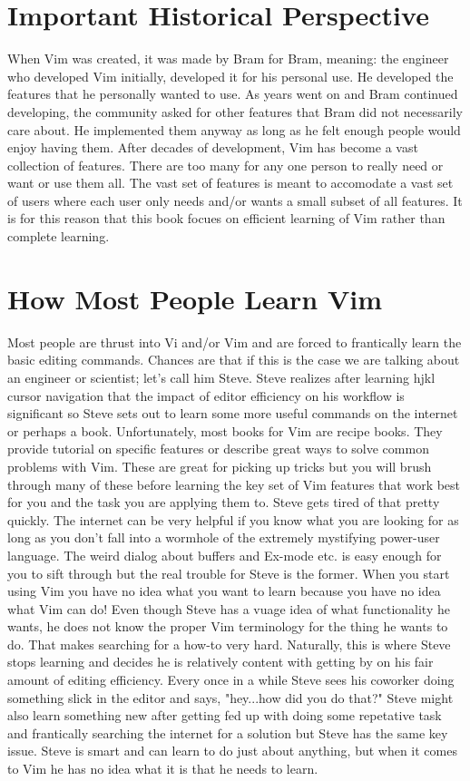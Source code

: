 \documentclass[12pt]{book}
\begin{document}
\section{Important Historical Perspective}
When Vim was created, it was made by Bram for Bram, meaning: the engineer who developed Vim initially, developed it for his personal use.
He developed the features that he personally wanted to use.  
As years went on and Bram continued developing, the community asked for other features that Bram did not necessarily care about.
He implemented them anyway as long as he felt enough people would enjoy having them. 
After decades of development, Vim has become a vast collection of features.
There are too many for any one person to really need or want or use them all.  
The vast set of features is meant to accomodate a vast set of users where each user only needs and/or wants a small subset of all features.
It is for this reason that this book focues on efficient learning of Vim rather than complete learning.  

\section{How Most People Learn Vim}
Most people are thrust into Vi and/or Vim and are forced to frantically learn the basic editing commands.  
Chances are that if this is the case we are talking about an engineer or scientist; let's call him Steve.  
Steve realizes after learning hjkl cursor navigation that the impact of editor efficiency on his workflow is significant so Steve sets out to learn some more useful commands on the internet 
or perhaps a book.  
Unfortunately, most books for Vim are recipe books.  
They provide tutorial on specific features or describe great ways to solve common problems with Vim.  
These are great for picking up tricks but you will brush through many of these before learning the key set of Vim features that work best for you and the task you are applying them to.  
Steve gets tired of that pretty quickly.  
The internet can be very helpful if you know what you are looking for as long as you don't fall into a wormhole of the extremely mystifying power-user language.  
The weird dialog about buffers and Ex-mode etc. is easy enough for you to sift through but the real trouble for Steve is the former.  
When you start using Vim you have no idea what you want to learn because you have no idea what Vim can do!  
Even though Steve has a vuage idea of what functionality he wants, he does not know the proper Vim terminology for the thing he wants to do.  
That makes searching for a how-to very hard.
Naturally, this is where Steve stops learning and decides he is relatively content with getting by on his fair amount of editing efficiency.  
Every once in a while Steve sees his coworker doing something slick in the editor and says, "hey...how did you do that?"  
Steve might also learn something new after getting fed up with doing some repetative task and frantically searching the internet for a solution but Steve has the same key issue.  
Steve is smart and can learn to do just about anything, but when it comes to Vim he has no idea what it is that he needs to learn.
\end{document}
